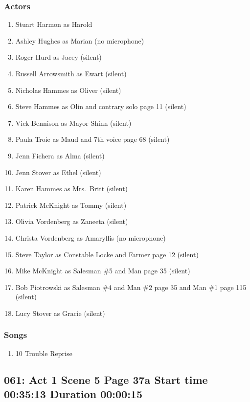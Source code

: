 \subsubsection{Actors}
\begin{enumerate}
\item Stuart Harmon as Harold
\item Ashley Hughes as Marian (no microphone)
\item Roger Hurd as Jacey (silent)
\item Russell Arrowsmith as Ewart (silent)
\item Nicholas Hammes as Oliver (silent)
\item Steve Hammes as Olin and contrary solo page 11 (silent)
\item Vick Bennison as Mayor Shinn (silent)
\item Paula Troie as Maud and 7th voice page 68 (silent)
\item Jenn Fichera as Alma (silent)
\item Jenn Stover as Ethel (silent)
\item Karen Hammes as Mrs.~Britt (silent)
\item Patrick McKnight as Tommy (silent)
\item Olivia Vordenberg as Zaneeta (silent)
\item Christa Vordenberg as Amaryllis (no microphone)
\item Steve Taylor as Constable Locke and Farmer page 12 (silent)
\item Mike McKnight as Salesman \#5 and Man page 35 (silent)
\item Bob Piotrowski as Salesman \#4 and Man \#2 page 35 and Man \#1 page 115 (silent)
\item Lucy Stover as Gracie (silent)
\end{enumerate}

\subsubsection{Songs}
\begin{enumerate}
\item 10 Trouble Reprise
\end{enumerate}
\subsection{061: Act 1 Scene 5 Page 37a Start time 00:35:13 Duration 00:00:15}

